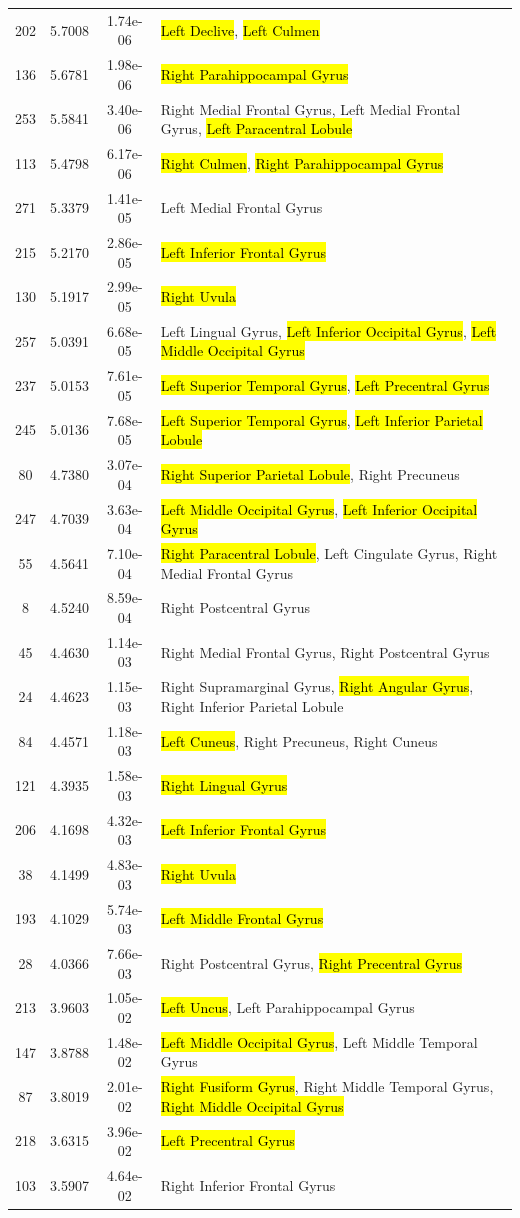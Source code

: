 \documentclass[10pt,letterpaper]{article}\usepackage[]{graphicx}\usepackage[]{color}
\begin{document}
\begin{longtable}[c]{cccp{3.2in}}
	202 & 5.7008 & 1.74e-06 & \hl{Left Declive}, \hl{Left Culmen} \\
	136 & 5.6781 & 1.98e-06 & \hl{Right Parahippocampal Gyrus} \\
	253 & 5.5841 & 3.40e-06 & Right Medial Frontal Gyrus, Left Medial Frontal Gyrus, \hl{Left Paracentral Lobule} \\
	113 & 5.4798 & 6.17e-06 & \hl{Right Culmen}, \hl{Right Parahippocampal Gyrus} \\
	271 & 5.3379 & 1.41e-05 & Left Medial Frontal Gyrus \\
	215 & 5.2170 & 2.86e-05 & \hl{Left Inferior Frontal Gyrus} \\
	130 & 5.1917 & 2.99e-05 & \hl{Right Uvula} \\
	257 & 5.0391 & 6.68e-05 & Left Lingual Gyrus, \hl{Left Inferior Occipital Gyrus}, \hl{Left Middle Occipital Gyrus} \\
	237 & 5.0153 & 7.61e-05 & \hl{Left Superior Temporal Gyrus}, \hl{Left Precentral Gyrus} \\
	245 & 5.0136 & 7.68e-05 & \hl{Left Superior Temporal Gyrus}, \hl{Left Inferior Parietal Lobule} \\
	80 & 4.7380 & 3.07e-04 & \hl{Right Superior Parietal Lobule}, Right Precuneus \\
	247 & 4.7039 & 3.63e-04 & \hl{Left Middle Occipital Gyrus}, \hl{Left Inferior Occipital Gyrus} \\
	55 & 4.5641 & 7.10e-04 & \hl{Right Paracentral Lobule}, Left Cingulate Gyrus, Right Medial Frontal Gyrus \\
	8 & 4.5240 & 8.59e-04 & Right Postcentral Gyrus \\
	45 & 4.4630 & 1.14e-03 & Right Medial Frontal Gyrus, Right Postcentral Gyrus \\
	24 & 4.4623 & 1.15e-03 & Right Supramarginal Gyrus, \hl{Right Angular Gyrus}, Right Inferior Parietal Lobule \\
	84 & 4.4571 & 1.18e-03 & \hl{Left Cuneus}, Right Precuneus, Right Cuneus \\
	121 & 4.3935 & 1.58e-03 & \hl{Right Lingual Gyrus} \\
	206 & 4.1698 & 4.32e-03 & \hl{Left Inferior Frontal Gyrus} \\
	38 & 4.1499 & 4.83e-03 & \hl{Right Uvula} \\
	193 & 4.1029 & 5.74e-03 & \hl{Left Middle Frontal Gyrus} \\
	28 & 4.0366 & 7.66e-03 & Right Postcentral Gyrus, \hl{Right Precentral Gyrus} \\
	213 & 3.9603 & 1.05e-02 & \hl{Left Uncus}, Left Parahippocampal Gyrus \\
	147 & 3.8788 & 1.48e-02 & \hl{Left Middle Occipital Gyrus}, Left Middle Temporal Gyrus \\
	87 & 3.8019 & 2.01e-02 & \hl{Right Fusiform Gyrus}, Right Middle Temporal Gyrus, \hl{Right Middle Occipital Gyrus} \\
	218 & 3.6315 & 3.96e-02 & \hl{Left Precentral Gyrus} \\
	103 & 3.5907 & 4.64e-02 & Right Inferior Frontal Gyrus \\
\end{longtable}
\end{document}
